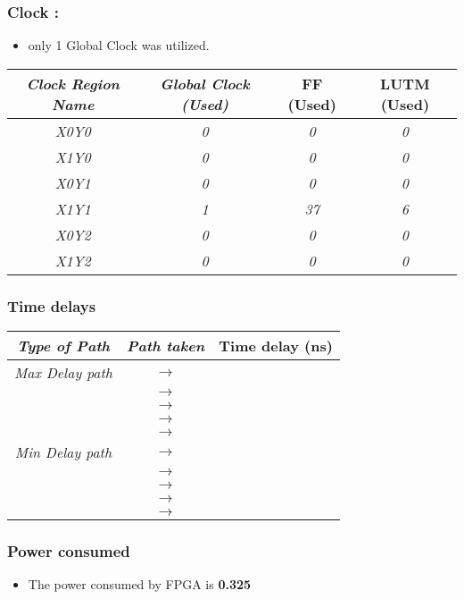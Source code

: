 \subsubsection*{Clock :}
\begin{itemize}
	\item only 1 Global Clock was utilized. 
\end{itemize}
\begin{center}
\begin{tabular}{|c|c|c|c|}\hline
\textit{Clock Region Name} & \textit{Global Clock (Used)} & \textbf{FF (Used)} & \textbf{LUTM (Used)}\\
\hline
\textit{X0Y0} & \textit{0} & \textit{0} & \textit{0}\\
\textit{X1Y0} & \textit{0} & \textit{0} & \textit{0}\\
\textit{X0Y1} & \textit{0} & \textit{0} & \textit{0}\\
\textit{X1Y1} & \textit{1} & \textit{37} & \textit{6}\\
\textit{X0Y2} & \textit{0} & \textit{0} & \textit{0}\\
\textit{X1Y2} & \textit{0} & \textit{0} & \textit{0}\\
\hline
\end{tabular}
\end{center}
\subsubsection*{Time delays}
\begin{center}
\begin{tabular}{|c|c|c|}\hline
\textit{Type of Path} & \textit{Path taken} & \textbf{Time delay (ns)}\\
\hline
\textit{Max Delay path} 
    & \textbf{} \(\rightarrow\) \textbf{} & \\\cline{2-3}
    & \textbf{} \(\rightarrow\) \textbf{}  & \\\cline{2-3}
    & \textbf{} \(\rightarrow\) \textbf{}  & \\\cline{2-3}
    & \textbf{} \(\rightarrow\) \textbf{}  & \\\cline{2-3}
    & \textbf{} \(\rightarrow\) \textbf{}  & \\\cline{2-3}
    \hline
\textit{Min Delay path}
    & \textbf{} \(\rightarrow\) \textbf{} & \\\cline{2-3}
    & \textbf{} \(\rightarrow\) \textbf{}  & \\\cline{2-3}
    & \textbf{} \(\rightarrow\) \textbf{}  & \\\cline{2-3}
    & \textbf{} \(\rightarrow\) \textbf{}  & \\\cline{2-3}
    & \textbf{} \(\rightarrow\) \textbf{}  & \\\cline{2-3}
    \hline
\end{tabular}
\end{center}
\subsubsection*{Power consumed}
\begin{itemize}
    \item The power consumed by FPGA is \textbf{0.325}
\end{itemize}

